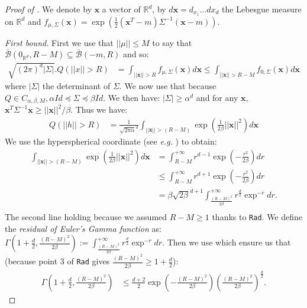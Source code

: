 \begin{noaddcontents}
\begin{proof}[Proof of ]
We denote by $\mathbf{x}$ a vector of $\mathbb{R}^d$, by $d\mathbf{x}= d_{x_1}...dx_{d}$ the Lebesgue measure on $\mathbb{R}^d$ and $f_{\mu,\Sigma}(\mathbf{x})= \exp\left(\frac{1}{2}(\mathbf{x}^T-m) \Sigma^{-1} (\mathbf{x}-m)  \right)$.

\textit{First bound.}
First we use that $||\mu||\leq M$ to say that $\bar{\mathcal{B}}(0_{\mathbb{R}^d}, R-M) \subseteq \bar{\mathcal{B}}(-m, R) $ and so:
\begin{align*}
\sqrt{(2 \pi)^d|\Sigma|}.Q(||x||> R) & = \int_{||\mathbf{x}||> R} f_{\mu,\Sigma}(\mathbf{x})d\mathbf{x} \leq  \int_{||\mathbf{x}||> R- M} f_{0,\Sigma}(\mathbf{x})d\mathbf{x}
\end{align*}
where $ |\Sigma|$ the determinant of $\Sigma$.
We now use that because $Q\in C_{\alpha,\beta, M}, \alpha Id \preceq \Sigma \preceq \beta Id$. We then have: $|\Sigma|\geq \alpha^d$ and for any $\mathbf{x}$, $\mathbf{x}^T \Sigma^{-1} \mathbf{x} \geq ||\mathbf{x}||^2/\beta.$
Thus we have:
\begin{align*}
Q(||h||>R) & = \frac{1}{\sqrt{2 \pi\alpha}^{d}}\int_{||\mathbf{x}||>(R-M)} \exp\left(\frac{1}{2\beta}||\mathbf{x}||^2  \right) d \mathbf{x}
\end{align*}
We use the hyperspherical coordinate (see \emph{e.g.} \citealp{blumenson1960derivation}) to obtain:
\begin{align*}
\int_{||\mathbf{x}||>(R-M)} \exp\left(\frac{1}{2\beta}||\mathbf{x}||^2  \right) d \mathbf{x} &= \int_{R-M}^{+\infty} r^{d-1} \exp\left(- \frac{r^2}{2\beta}\right)dr\\
& \leq \int_{R-M}^{+\infty} r^{d+1} \exp\left(- \frac{r^2}{2\beta}\right)dr \\
&= \beta\sqrt{2\beta}^{d+1} \int_{\frac{(R-M)^2}{2\beta}}^{+\infty} r^{\frac{d}{2}} \exp^{-r}dr.\\
\end{align*}
The second line holding because we assumed $R-M\geq 1$ thanks to \texttt{Rad}. We define the \emph{residual of Euler's Gamma function} as:   $\Gamma\left(1+\frac{d}{2}, \frac{(R-M)^2}{2\beta}\right):= \int_{\frac{(R-M)^2}{2\beta}}^{+\infty} r^{\frac{d}{2}} \exp^{-r}dr$.
Then we use \citet[Lemma 4.4.3, p.84]{gabcke1979neue} which ensure us that (because point 3 of \texttt{Rad} gives $\frac{(R-M)^2}{2\beta}\geq 1+\frac{d}{2}$):
\begin{align*}
\Gamma\left(1+\frac{d}{2}, \frac{(R-M)^2}{2\beta}\right) & \leq \frac{d+2}{2}\exp\left({-\frac{(R-M)^2}{2\beta}} \right) \left(\frac{(R-M)^2}{2\beta}\right)^{\frac{d}{2}}.

\end{align*}
\end{proof}
\end{noaddcontents}
